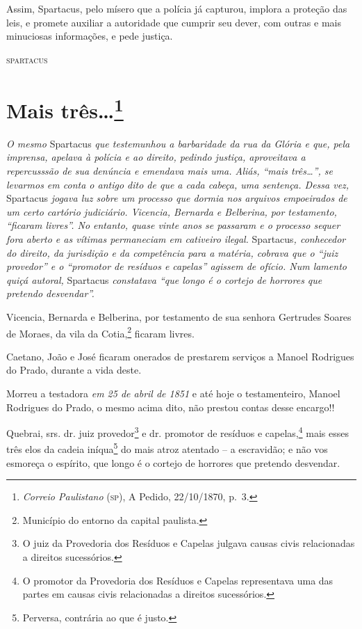 {Assim, Spartacus, pelo mísero que a polícia já capturou, implora a
proteção das leis, e promete auxiliar a autoridade que cumprir seu
dever, com outras e mais minuciosas informações, e pede justiça.

\begin{flushright}
\textsc{spartacus}
\end{flushright}

\chapter{Mais três\ldots{}\footnote{\emph{Correio Paulistano} (\textsc{sp}), A Pedido, 22/10/1870,
  p.~3.}} %

\begin{didascalia}
\emph{O mesmo} Spartacus \emph{que testemunhou a barbaridade da rua da
Glória e que, pela imprensa, apelava à polícia e ao direito, pedindo
justiça, aproveitava a repercusssão de sua denúncia e emendava mais uma.
Aliás, ``mais três\ldots{}'', se levarmos em conta o antigo dito de que a cada
cabeça, uma sentença. Dessa vez,} Spartacus \emph{jogava luz sobre um
processo que dormia nos arquivos empoeirados de um certo cartório
judiciário. Vicencia, Bernarda e Belberina, por testamento, ``ficaram
livres''. No entanto, quase vinte anos se passaram e o processo sequer
fora aberto e as vítimas permaneciam em cativeiro ilegal.}
Spartacus\emph{, conhecedor do direito, da jurisdição e da competência
para a matéria, cobrava que o ``juiz provedor'' e o ``promotor de resíduos
e capelas'' agissem de ofício. Num lamento quiçá autoral,} Spartacus
\emph{constatava ``que longo é o cortejo de horrores que pretendo
desvendar''.}
\end{didascalia}


Vicencia, Bernarda e Belberina, por testamento de sua senhora Gertrudes
Soares de Moraes, da vila da Cotia,\footnote{ Município do entorno da
  capital paulista.} ficaram livres.

Caetano, João e José ficaram onerados de prestarem serviços a Manoel
Rodrigues do Prado, durante a vida deste.

Morreu a testadora \emph{em 25 de abril de 1851} e até hoje o
testamenteiro, Manoel Rodrigues do Prado, o mesmo acima dito, não
prestou contas desse encargo!!

Quebrai, srs. dr. juiz provedor\footnote{ O juiz da Provedoria dos
  Resíduos e Capelas julgava causas civis relacionadas a direitos
  sucessórios.} e dr. promotor de resíduos e capelas,\footnote{ O
  promotor da Provedoria dos Resíduos e Capelas representava uma das
  partes em causas civis relacionadas a direitos sucessórios.} mais
esses três elos da cadeia iníqua\footnote{ Perversa, contrária ao que é
  justo.} do mais atroz atentado -- a escravidão; e não vos esmoreça o
espírito, que longo é o cortejo de horrores que pretendo desvendar.

}
